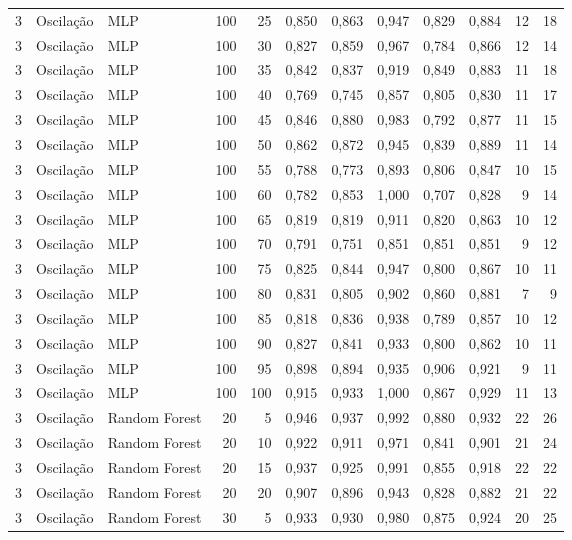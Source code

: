 \begin{longtable}{@{}rllrrrrrrrrr@{}}
3 & Oscilação & MLP & 100 & 25 & 0,850 & 0,863 & 0,947 & 0,829 & 0,884 & 12 & 18 \\
3 & Oscilação & MLP & 100 & 30 & 0,827 & 0,859 & 0,967 & 0,784 & 0,866 & 12 & 14 \\
3 & Oscilação & MLP & 100 & 35 & 0,842 & 0,837 & 0,919 & 0,849 & 0,883 & 11 & 18 \\
3 & Oscilação & MLP & 100 & 40 & 0,769 & 0,745 & 0,857 & 0,805 & 0,830 & 11 & 17 \\
3 & Oscilação & MLP & 100 & 45 & 0,846 & 0,880 & 0,983 & 0,792 & 0,877 & 11 & 15 \\
3 & Oscilação & MLP & 100 & 50 & 0,862 & 0,872 & 0,945 & 0,839 & 0,889 & 11 & 14 \\
3 & Oscilação & MLP & 100 & 55 & 0,788 & 0,773 & 0,893 & 0,806 & 0,847 & 10 & 15 \\
3 & Oscilação & MLP & 100 & 60 & 0,782 & 0,853 & 1,000 & 0,707 & 0,828 & 9 & 14 \\
3 & Oscilação & MLP & 100 & 65 & 0,819 & 0,819 & 0,911 & 0,820 & 0,863 & 10 & 12 \\
3 & Oscilação & MLP & 100 & 70 & 0,791 & 0,751 & 0,851 & 0,851 & 0,851 & 9 & 12 \\
3 & Oscilação & MLP & 100 & 75 & 0,825 & 0,844 & 0,947 & 0,800 & 0,867 & 10 & 11 \\
3 & Oscilação & MLP & 100 & 80 & 0,831 & 0,805 & 0,902 & 0,860 & 0,881 & 7 & 9 \\
3 & Oscilação & MLP & 100 & 85 & 0,818 & 0,836 & 0,938 & 0,789 & 0,857 & 10 & 12 \\
3 & Oscilação & MLP & 100 & 90 & 0,827 & 0,841 & 0,933 & 0,800 & 0,862 & 10 & 11 \\
3 & Oscilação & MLP & 100 & 95 & 0,898 & 0,894 & 0,935 & 0,906 & 0,921 & 9 & 11 \\
3 & Oscilação & MLP & 100 & 100 & 0,915 & 0,933 & 1,000 & 0,867 & 0,929 & 11 & 13 \\
3 & Oscilação & Random Forest & 20 & 5 & 0,946 & 0,937 & 0,992 & 0,880 & 0,932 & 22 & 26 \\
3 & Oscilação & Random Forest & 20 & 10 & 0,922 & 0,911 & 0,971 & 0,841 & 0,901 & 21 & 24 \\
3 & Oscilação & Random Forest & 20 & 15 & 0,937 & 0,925 & 0,991 & 0,855 & 0,918 & 22 & 22 \\
3 & Oscilação & Random Forest & 20 & 20 & 0,907 & 0,896 & 0,943 & 0,828 & 0,882 & 21 & 22 \\
3 & Oscilação & Random Forest & 30 & 5 & 0,933 & 0,930 & 0,980 & 0,875 & 0,924 & 20 & 25 \\

\end{longtable}
